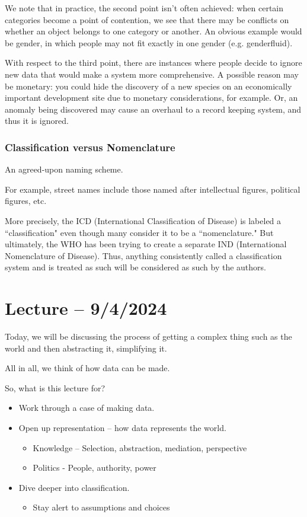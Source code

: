 \documentclass[openany]{book}
\begin{document}
We note that in practice, the second point isn't often achieved: when certain categories become a point of contention, we see that there may be conflicts on whether an object belongs to one category or another. An obvious example would be gender, in which people may not fit exactly in one gender (e.g. genderfluid).

With respect to the third point, there are instances where people decide to ignore new data that would make a system more comprehensive. A possible reason may be monetary: you could hide the discovery of a new species on an economically important development site due to monetary considerations, for example. Or, an anomaly being discovered may cause an overhaul to a record keeping system, and thus it is ignored.

\subsubsection{Classification versus Nomenclature}
\begin{defn}[Nomenclature]
	An agreed-upon naming scheme.
\end{defn}
\begin{example}
	For example, street names include those named after intellectual figures, political figures, etc.
\end{example}

More precisely, the ICD (International Classification of Disease) is labeled a ``classification" even though many consider it to be a ``nomenclature." But ultimately, the WHO has been trying to create a separate IND (International Nomenclature of Disease). Thus, anything consistently called a classification system and is treated as such will be considered as such by the authors.

\section{Lecture -- 9/4/2024}
Today, we will be discussing the process of getting a complex thing such as the world and then abstracting it, simplifying it.

All in all, we think of how data can be made.

So, what is this lecture for?
\begin{itemize}
	\item Work through a case of making data.
	\item Open up representation -- how data represents the world.
	\begin{itemize}
		\item Knowledge -- Selection, abstraction, mediation, perspective
		\item Politics - People, authority, power
	\end{itemize}
	\item Dive deeper into classification.
	\begin{itemize}
		\item Stay alert to assumptions and choices
	\end{itemize}
\end{itemize}
\end{document}
